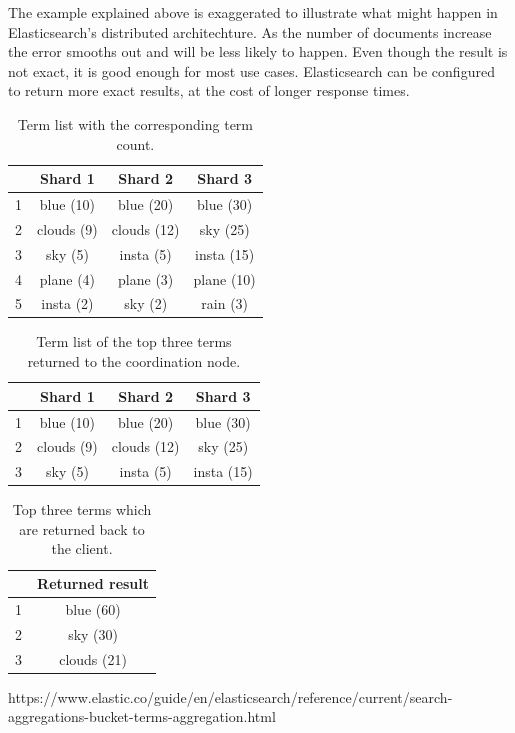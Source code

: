 The example explained above is exaggerated to illustrate what might happen in Elasticsearch's distributed architechture.
As the number of documents increase the error smooths out and will be less likely to happen.
Even though the result is not exact, it is good enough for most use cases.
Elasticsearch can be configured to return more exact results,
at the cost of longer response times.

\begin{table}[h!]
    \centering
    \begin{tabular}{|l|c|c|c|}
    \hline
    ~ & \textbf{Shard 1}    & \textbf{Shard 2}     & \textbf{Shard 3}    \\ \hline
    1 & blue (10)  & blue (20)   & blue (30)  \\ \hline
    2 & clouds (9) & clouds (12) & sky (25)   \\ \hline
    3 & sky (5)    & insta (5)   & insta (15) \\ \hline
    4 & plane (4)  & plane (3)   & plane (10) \\ \hline
    5 & insta (2)  & sky (2)     & rain (3)   \\ \hline
    \end{tabular}
    \caption{Term list with the corresponding term count.}
    \label{tbl:shard-term-counts}
\end{table}

\begin{table}[h!]
    \centering
    \begin{tabular}{|l|c|c|c|}
    \hline
    ~ & \textbf{Shard 1}    & \textbf{Shard 2}     & \textbf{Shard 3}    \\ \hline
    1 & blue (10)  & blue (20)   & blue (30)  \\ \hline
    2 & clouds (9) & clouds (12) & sky (25)   \\ \hline
    3 & sky (5)    & insta (5)   & insta (15) \\ \hline
    \end{tabular}
    \caption{Term list of the top three terms returned to the coordination node.}
    \label{tbl:shard-top}
\end{table}

\begin{table}[h!]
    \centering
    \begin{tabular}{|l|c|}
    \hline
    ~ & \textbf{Returned result} \\ \hline
    1 & blue (60)     \\ \hline
    2 & sky (30)    \\ \hline
    3 & clouds (21)       \\ \hline
    \end{tabular}
    \caption{Top three terms which are returned back to the client.}
    \label{tbl:final-result}
\end{table}

https://www.elastic.co/guide/en/elasticsearch/reference/current/search-aggregations-bucket-terms-aggregation.html
